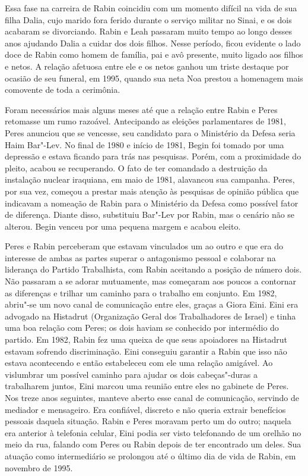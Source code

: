 Essa fase na carreira de Rabin coincidiu com um momento difícil na vida
de sua filha Dalia, cujo marido fora ferido durante o serviço
militar no Sinai, e os dois acabaram se divorciando. Rabin e Leah
passaram muito tempo ao longo desses anos ajudando Dalia a cuidar dos
dois filhos. Nesse período, ficou evidente o lado doce de Rabin como
homem de família, pai e avô presente, muito ligado aos filhos e netos. A
relação afetuosa entre ele e os netos ganhou um triste destaque por
ocasião de seu funeral, em 1995, quando sua neta Noa prestou a homenagem
mais comovente de toda a cerimônia.

Foram necessários mais alguns meses até que a relação entre Rabin e
Peres retomasse um rumo razoável. Antecipando as eleições parlamentares
de 1981, Peres anunciou que se vencesse, seu candidato para o Ministério
da Defesa seria Haim Bar"-Lev. No final de 1980 e início de 1981, Begin
foi tomado por uma depressão e estava ficando para trás nas pesquisas.
Porém, com a proximidade do pleito, acabou se recuperando. O fato de
ter comandado a destruição da instalação nuclear iraquiana, em maio de
1981, alavancou sua campanha. Peres, por sua vez, começou a prestar mais
atenção às pesquisas de opinião pública que indicavam a nomeação de
Rabin para o Ministério da Defesa como possível fator de diferença.
Diante disso, substituiu Bar"-Lev por Rabin, mas o cenário não se
alterou. Begin venceu por uma pequena margem e acabou eleito.

Peres e Rabin perceberam que estavam vinculados um ao outro e que era do
interesse de ambas as partes superar o antagonismo pessoal e colaborar
na liderança do Partido Trabalhista, com Rabin aceitando a posição de
número dois. Não passaram a se adorar mutuamente, mas começaram aos
poucos a contornar as diferenças e trilhar um caminho para o trabalho em
conjunto. Em 1982, abriu"-se um novo canal de comunicação entre eles,
graças a Giora Eini. Eini era advogado na Histadrut (Organização Geral
dos Trabalhadores de Israel) e tinha uma boa relação com Peres; os dois
haviam se conhecido por intermédio do partido. Em 1982, Rabin fez uma
queixa de que seus apoiadores na Histadrut estavam sofrendo
discriminação. Eini conseguiu garantir a Rabin que isso não estava
acontecendo e então estabeleceu com ele uma relação amigável. Ao
vislumbrar um possível caminho para ajudar os dois cabeças"-duras a
trabalharem juntos, Eini marcou uma reunião entre eles no gabinete de
Peres. Nos treze anos seguintes, manteve aberto esse canal de
comunicação, servindo de mediador e mensageiro. Era confiável, discreto
e não queria extrair benefícios pessoais daquela situação. Rabin e Peres
moravam perto um do outro; naquela era anterior à telefonia celular, Eini podia ser visto
telefonando de um orelhão no meio da rua, falando com Peres ou Rabin
depois de ter encontrado um deles. Sua atuação como intermediário se
prolongou até o último dia de vida de Rabin, em novembro de 1995.

